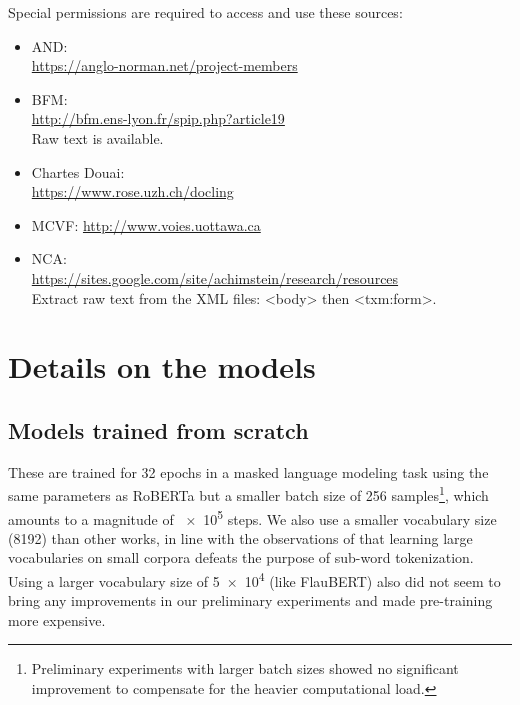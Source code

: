 Special permissions are required to access and use these sources:
\begin{itemize}
    \item AND: \\ \url{https://anglo-norman.net/project-members}
    \item BFM: \\ \url{http://bfm.ens-lyon.fr/spip.php?article19} \\
          Raw text is available.
    \item Chartes Douai: \\
          \url{https://www.rose.uzh.ch/docling}
    \item MCVF: \url{http://www.voies.uottawa.ca}
    \item NCA: \\ \url{https://sites.google.com/site/achimstein/research/resources} \\
          Extract raw text from the XML files: <body> then <txm:form>.
\end{itemize}


\section{Details on the models}

\subsection{Models trained from scratch}

These are trained for \num{32} epochs in a masked language modeling task using the same parameters as RoBERTa \citep{liu-etal-2019-roberta} but a smaller batch size of \num{256} samples\footnote{Preliminary experiments with larger batch sizes showed no significant improvement to compensate for the heavier computational load.}, which amounts to a magnitude of \num{e5} steps.
We also use a smaller vocabulary size (\num{8192}) than other works, in line with the observations of \citet{ding-etal-2019-call} that learning large vocabularies on small corpora defeats the purpose of sub-word tokenization.
Using a larger vocabulary size of \num{5e4} (like FlauBERT) also did not seem to bring any improvements in our preliminary experiments and made pre-training more expensive.

